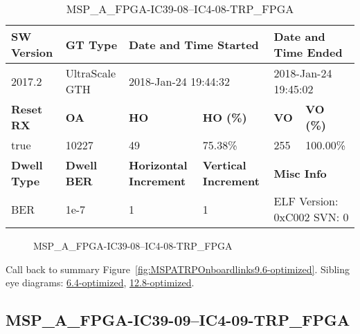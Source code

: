 \begin{table}[h]
\centering
\caption{MSP\_A\_FPGA-IC39-08--IC4-08-TRP\_FPGA}
\label{tab:MSPAFPGAIC3908IC408TRPFPGA9.6-optimized}
\begin{tabular}{@{}|l|l|l|l|l|l|@{}}
\toprule
\textbf{SW Version}                & \textbf{GT Type}   & \multicolumn{2}{l|}{\textbf{Date and Time Started}}            & \multicolumn{2}{l|}{\textbf{Date and Time Ended}}        \\ \midrule
2017.2                       & UltraScale GTH          & \multicolumn{2}{l|}{2018-Jan-24 19:44:32}                   & \multicolumn{2}{l|}{2018-Jan-24 19:45:02}               \\ \midrule
\textbf{Reset RX}                  & \textbf{OA} & \textbf{HO}   & \textbf{HO (\%)} & \textbf{VO} & \textbf{VO (\%)} \\ \midrule
true & 10227        & 49          & 75.38\%        & 255        & 100.00\%       \\ \midrule
\textbf{Dwell Type}                & \textbf{Dwell BER} & \textbf{Horizontal Increment} & \textbf{Vertical Increment}    & \multicolumn{2}{l|}{\textbf{Misc Info}}                  \\ \midrule
BER                            & 1e-7        & 1        & 1           & \multicolumn{2}{l|}{ELF Version: 0xC002 SVN: 0}                         \\ \bottomrule
\end{tabular}
\end{table}

\begin{figure}[h]
\caption{MSP\_A\_FPGA-IC39-08--IC4-08-TRP\_FPGA} \label{fig:MSPAFPGAIC3908IC408TRPFPGA9.6-optimized}
\end{figure}

Call back to summary Figure~\ref{fig:MSPATRPOnboardlinks9.6-optimized}.
Sibling eye diagrams: \hyperref[sec:MSPAFPGAIC3908IC408TRPFPGA6.4-optimized]{6.4-optimized}, \hyperref[sec:MSPAFPGAIC3908IC408TRPFPGA12.8-optimized]{12.8-optimized}.

\clearpage
\newpage


\subsection{MSP\_A\_FPGA-IC39-09--IC4-09-TRP\_FPGA}\label{sec:MSPAFPGAIC3909IC409TRPFPGA9.6-optimized}

